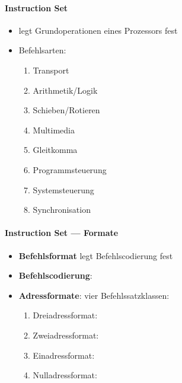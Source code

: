 \paragraph{Instruction Set}
\begin{itemize}
	\item legt Grundoperationen eines Prozessors fest
	\item Befehlsarten:
	\begin{enumerate}
		\item Transport
		\item Arithmetik/Logik
		\item Schieben/Rotieren
		\item Multimedia
		\item Gleitkomma
		\item Programmsteuerung
		\item Systemsteuerung
		\item Synchronisation
	\end{enumerate}
\end{itemize}

\paragraph{Instruction Set --- Formate}
\begin{itemize}
	\item \textbf{Befehlsformat} legt Befehlscodierung fest
	\item \textbf{Befehlscodierung}: 
	\item \textbf{Adressformate}: vier Befehlssatzklassen:
	\begin{enumerate}
		\item Dreiadressformat: \code{[opcode] [dest] [src1] [src2]}
		\item Zweiadressformat: 
		\item Einadressformat: \code{[opcode] [src]}
		\item Nulladressformat: \code{[opcode]}
	\end{enumerate}
\end{itemize}

